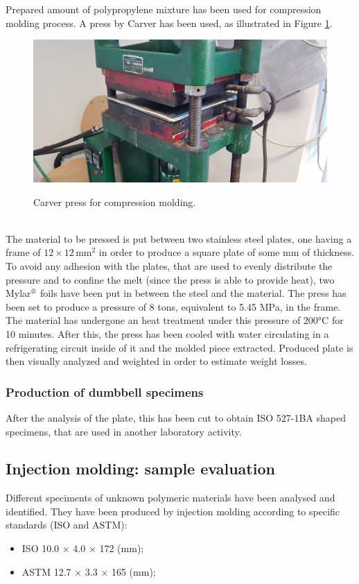 \documentclass[a4paper, 11pt]{article}
\begin{document}
Prepared amount of polypropylene mixture has been used for compression molding process. A press by Carver has been used, as illustrated in Figure \ref{fig:press}. 
\begin{figure}[htp]
	\centering
	\includegraphics[scale=0.2]
	{PHOTO-2019-05-23-17-38-03.jpg}
	\label{fig:press}
	\caption{Carver press for compression molding.}
\end{figure}\\
The material to be pressed is put between two stainless steel plates, one having a frame of $12\times 12\, \text{mm}^2$ in order to produce a square plate of some mm of thickness. To avoid any adhesion with the plates, that are used to evenly distribute the pressure and to confine the melt (since the press is able to provide heat), two Mylar${^\text{\textregistered}}$ foils have been put in between the steel and the material. The press has been set to produce a pressure of 8 tons, equivalent to 5.45 MPa, in the frame. The material has undergone an heat treatment under this pressure of 200°C for 10 minutes. After this, the press has been cooled with water circulating in a refrigerating circuit inside of it and the molded piece extracted. Produced plate is then visually analyzed and weighted in order to estimate weight losses. \par 

\subsubsection{Production of dumbbell specimens}

After the analysis of the plate, this has been cut to obtain ISO 527-1BA shaped specimens, that are used in another laboratory activity.     

\subsection{Injection molding: sample evaluation}
Different speciments of unknown polymeric materials have been analysed and identified. They have been produced by injection molding according to specific standards (ISO and ASTM):
\begin{itemize}
\item ISO 10.0 $\times$ 4.0 $\times$ 172 (mm);
\item ASTM 12.7 $\times$ 3.3 $\times$ 165 (mm);
\end{itemize}
\end{document}
